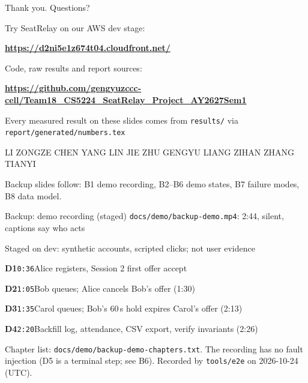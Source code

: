 \documentclass[t,20pt]{beamer}
\newcommand{\code}[1]{\texttt{#1}}
\newcommand{\hl}[1]{\textbf{\color{srBlue}#1}}
\newcommand{\mute}[1]{{\color{srMuted}#1}}
\newcommand{\srspeaker}{}
\newcommand{\speaker}[1]{\renewcommand{\srspeaker}{#1}}
\newcommand{\source}[1]{\par\vfill{\fontsize{13}{15}\selectfont\color{srMuted}#1\par}\vspace{0.06in}}
\newcommand{\chap}[3]{\textbf{\color{srBlue}#1}\enspace\code{#2}\enspace #3\par\vspace{0.06in}}
\begin{document}
\begin{frame}{Thank you. Questions?}
  \vspace{0.20in}
  {\fontsize{26}{32}\selectfont Try SeatRelay on our AWS dev stage:\par}
  \vspace{0.08in}
  \hl{\url{https://d2ni5e1z674t04.cloudfront.net/}}\par
  \vspace{0.24in}
  {\fontsize{26}{32}\selectfont Code, raw results and report sources:\par}
  \vspace{0.08in}
  \hl{\url{https://github.com/gengyuzccc-cell/Team18_CS5224_SeatRelay_Project_AY2627Sem1}}\par
  \vspace{0.26in}
  Every measured result on these slides comes from \code{results/} via \code{report/generated/numbers.tex}\par
  \vspace{0.26in}
  \mute{LI ZONGZE \textperiodcentered{} CHEN YANG \textperiodcentered{} LIN JIE \textperiodcentered{}
    ZHU GENGYU \textperiodcentered{} LIANG ZIHAN \textperiodcentered{} ZHANG TIANYI}\par
  \source{Backup slides follow: B1 demo recording, B2--B6 demo states, B7 failure modes, B8 data model.}
\end{frame}

\appendix
\speaker{ZHANG TIANYI}
\begin{frame}{Backup: demo recording (staged)}
  \vspace{0.06in}
  \code{docs/demo/backup-demo.mp4}: 2:44, silent, captions say who acts\par\vspace{0.10in}
  Staged on dev: synthetic accounts, scripted clicks; not user evidence\par\vspace{0.30in}
  \chap{D1}{0:36}{Alice registers, Session 2 first \textrightarrow{} offer \textrightarrow{} accept}
  \chap{D2}{1:05}{Bob queues; Alice cancels \textrightarrow{} Bob's offer (1:30)}
  \chap{D3}{1:35}{Carol queues; Bob's 60\,s hold expires \textrightarrow{} Carol's offer (2:13)}
  \chap{D4}{2:20}{Backfill log, attendance, CSV export, verify invariants (2:26)}
  \source{Chapter list: \code{docs/demo/backup-demo-chapters.txt}. The recording has no fault
    injection (D5 is a terminal step; see B6). Recorded by \code{tools/e2e} on 2026-10-24 (UTC).}
\end{frame}
\end{document}
